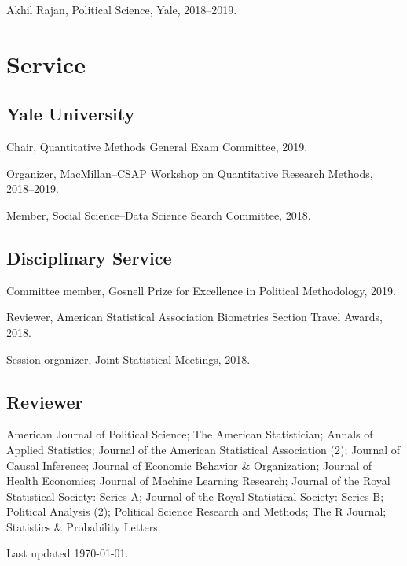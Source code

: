 \documentclass[10pt,letterpaper]{article}
\newenvironment{infolist}{
	\begin{list}{}{
		\setlength{\parskip}{0pt}
		\setlength{\itemsep}{4pt}
		\setlength{\parsep}{0.3em}
		\setlength{\leftmargin}{0em}
		\setlength{\labelwidth}{0em}
		}
	}{
\end{list}
}
\newcommand{\infoitem}[1]{\item {#1}}
\begin{document}
	\begin{infolist}
		\infoitem{Akhil Rajan, Political Science, Yale, 2018--2019.}
	\end{infolist}


	\section*{Service}

	\subsection*{Yale University}

	\begin{infolist}
		\infoitem{Chair, Quantitative Methods General Exam Committee, 2019.}
		\infoitem{Organizer, MacMillan--CSAP Workshop on Quantitative Research Methods, 2018--2019.}
		\infoitem{Member, Social Science--Data Science Search Committee, 2018.}
	\end{infolist}

	\subsection*{Disciplinary Service}

	\begin{infolist}
		\infoitem{Committee member, Gosnell Prize for Excellence in Political Methodology, 2019.}
		\infoitem{Reviewer, American Statistical Association Biometrics Section Travel Awards, 2018.}
		\infoitem{Session organizer, Joint Statistical Meetings, 2018.}
	\end{infolist}

	\subsection*{Reviewer}

	\begin{infolist}
		\infoitem{American Journal of Political Science; The American Statistician; Annals of Applied Statistics; Journal of the American Statistical Association (2); Journal of Causal Inference; Journal of Economic Behavior \& Organization; Journal of Health Economics; Journal of Machine Learning Research; Journal of the Royal Statistical Society: Series A; Journal of the Royal Statistical Society: Series B; Political Analysis (2); Political Science Research and Methods; The R Journal; Statistics \& Probability Letters.}
	\end{infolist}

	\bigskip
	{\small Last updated \today.}
\end{document}
